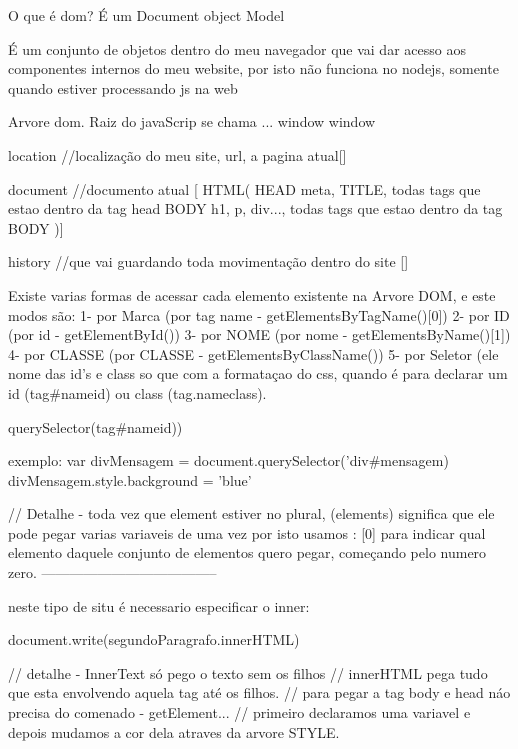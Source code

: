 O que é dom?
É um Document object Model

É um conjunto de objetos dentro do meu navegador que vai dar acesso aos componentes internos do meu website, por isto não funciona no nodejs, somente quando estiver processando js na web

Arvore dom.
Raiz do javaScrip se chama ... window
window{
    location //localização do meu site, url, a pagina atual[]

    document //documento atual [
        HTML(
                HEAD {
                    meta, TITLE, todas tags que estao dentro da tag head
                }
                BODY{
                    h1, p, div...,  todas tags que estao dentro da tag BODY
                }
    )]

    history //que vai guardando toda movimentação dentro do site []
}

Existe varias formas de acessar cada elemento existente na Arvore DOM, e este modos são:
1- por Marca (por tag name - getElementsByTagName()[0])
2- por ID (por id - getElementById())
3- por NOME (por nome - getElementsByName()[1])
4- por CLASSE (por CLASSE - getElementsByClassName())
5- por Seletor (ele nome das id's e class so que com a formataçao do css, 
quando é para declarar um id (tag#nameid) 
ou class (tag.nameclass).

querySelector(tag#nameid))

exemplo:
var divMensagem = document.querySelector('div#mensagem)
divMensagem.style.background = 'blue'

// Detalhe - toda vez que element estiver no plural, (elements) significa que ele pode pegar varias variaveis de uma vez por isto usamos : [0]
para indicar qual elemento daquele conjunto de elementos quero pegar, começando pelo numero zero.
--------------------------------------

neste tipo de situ é necessario especificar o inner:

document.write(segundoParagrafo.innerHTML)

// detalhe - InnerText só pego o texto sem os filhos 
// innerHTML pega tudo que esta envolvendo aquela tag até os filhos.
// para pegar a tag body e head náo precisa do comenado - getElement...
// primeiro declaramos uma variavel e depois mudamos a cor dela atraves da arvore STYLE.